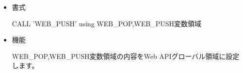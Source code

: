 
\begin{itemize}
\item{書式}

CALL 'WEB\_PUSH' using WEB\_POP,WEB\_PUSH変数領域

\item{機能}

WEB\_POP,WEB\_PUSH変数領域の内容をWeb APIグローバル領域に設定します。

\vspace{1em}

\end{itemize}